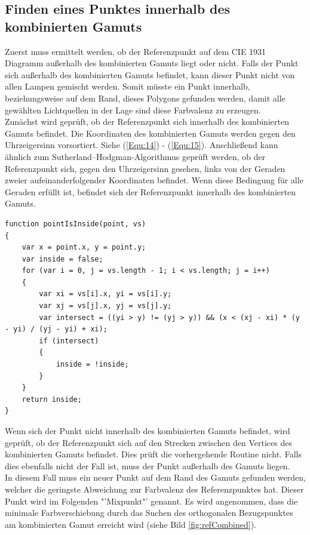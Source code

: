 \documentclass[11pt]{scrartcl}
\begin{document}
\subsection{Finden eines Punktes innerhalb des kombinierten Gamuts}
Zuerst muss ermittelt werden, ob der Referenzpunkt auf dem CIE 1931 Diagramm außerhalb des kombinierten Gamuts liegt oder nicht. Falls der Punkt sich außerhalb des
kombinierten Gamuts befindet, kann dieser Punkt nicht von allen Lampen gemischt werden. Somit müsste ein Punkt innerhalb, beziehungsweise auf dem Rand,
dieses Polygons gefunden werden, damit alle gewählten Lichtquellen in der Lage sind diese Farbvalenz zu erzeugen.\\
Zunächst wird geprüft, ob der Referenzpunkt sich innerhalb des kombinierten Gamuts befindet. Die Koordinaten des kombinierten Gamuts werden gegen den
Uhrzeigersinn vorsortiert. Siehe (\ref{Equ:14}) - (\ref{Equ:15}). Anschließend kann ähnlich zum Sutherland–Hodgman-Algorithmus geprüft werden, ob
der Referenzpunkt sich, gegen den Uhrzeigersinn gesehen, links von der Geraden zweier aufeinanderfolgender Koordinaten befindet. Wenn diese Bedingung für alle
Geraden erfüllt ist, befindet sich der Referenzpunkt innerhalb des kombinierten Gamuts.\\
\begin{lstlisting}[caption=Punkt in Polygon Check]
function pointIsInside(point, vs)
{
    var x = point.x, y = point.y;
    var inside = false;
    for (var i = 0, j = vs.length - 1; i < vs.length; j = i++)
    {
        var xi = vs[i].x, yi = vs[i].y;
        var xj = vs[j].x, yj = vs[j].y;
        var intersect = ((yi > y) != (yj > y)) && (x < (xj - xi) * (y - yi) / (yj - yi) + xi);
        if (intersect)
        {
            inside = !inside;
        }
    }
    return inside;
}
\end{lstlisting}
Wenn sich der Punkt nicht innerhalb des kombinierten Gamuts befindet, wird geprüft, ob der Referenzpunkt sich auf den Strecken zwischen den Vertices des
kombinierten Gamuts befindet. Dies prüft die vorhergehende Routine nicht. Falls dies ebenfalls nicht der Fall ist, muss der Punkt außerhalb des Gamuts liegen.\\
In diesem Fall muss ein neuer Punkt auf dem Rand des Gamuts gefunden werden, welcher die geringste Abweichung zur Farbvalenz des Referenzpunktes hat. Dieser
Punkt wird im Folgenden "'Mixpunkt"' genannt.
Es wird angenommen, dass die minimale Farbverschiebung durch das Suchen des orthogonalen Bezugspunktes am kombinierten Gamut erreicht wird (siehe
Bild \ref{fig:refCombined}).
\end{document}
